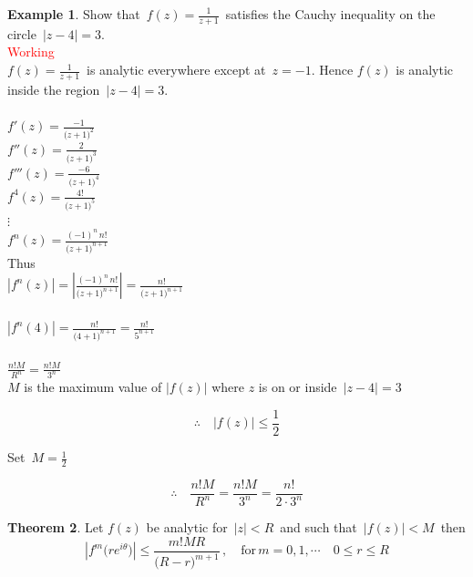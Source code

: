 \documentclass[11pt,a4paper]{article}
\theoremstyle{definition}
\newtheorem{thm}{Theorem}[section]
\newtheorem{example}[thm]{Example}
\begin{document}
\pagebreak
\begin{example}
Show that $\, f(z) = \frac{1}{z + 1}\,$ satisfies the Cauchy inequality on the circle $\,\left|z - 4\right| = 3$.\\

\textcolor{red}{Working}\\
$f(z) = \frac{1}{z + 1}\,$ is analytic everywhere except at $\, z = -1$.  Hence $f(z)$ is analytic inside the region $\, \left|z - 4\right| = 3$.\\\\



$f'(z) = \frac{-1}{\big(z + 1\big)^2}$\\

$f''(z) = \frac{2}{\big(z + 1\big)^3}$\\

$f'''(z) = \frac{-6}{\big(z + 1\big)^4}$\\

$f^4(z) = \frac{4!}{\big(z + 1\big)^5}$\\

$\vdots$\\

$f^n(z) = \frac{(-1)^n\,n!}{\big(z + 1\big)^{n + 1}}$\\

Thus\\

$\left|f^n(z)\right|  = \left|\frac{(-1)^n\,n!}{\big(z + 1\big)^{n + 1}}\right| = \frac{n!}{\big(z + 1\big)^{n + 1}}$\\\\

$\left|f^n(4)\right| = \frac{n!}{\big(4 + 1\big)^{n + 1}} = \frac{n!}{5^{n + 1}}$\\\\


$\frac{n! M}{R^n}  = \frac{n! M}{3^n}$\\

$M$ is the maximum value of $\left|f(z)\right|$ where $z$ is on or inside $\, \left|z - 4\right| = 3$

$$\therefore\quad  \left|f(z)\right| \leq \frac{1}{2}$$

Set $\, M = \frac{1}{2}$ 

$$\therefore\quad  \frac{n! M}{R^n} = \frac{n! M}{3^n} = \frac{n!}{2\cdot 3^n}$$
\end{example}

\pagebreak
\begin{thm}
Let $f(z)$ be analytic for $\, \left|z\right| < R\,$ and such that $\, \left|f(z)\right| < M\,$ then $$\left|f^m\big(re^{i\theta}\big)\right| \leq \frac{m! MR}{\big(R - r\big)^{m+1}}\,,\quad \text{for}\, m = 0, 1, \cdots\quad  0\leq r\leq R$$
\end{thm}
\end{document}
